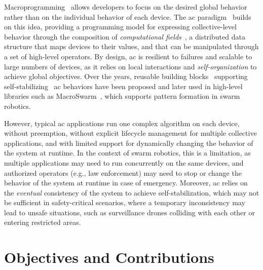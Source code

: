 \documentclass[conference]{IEEEtran}
\begin{document}
Macroprogramming~\cite{casadei22} allows developers to focus on the desired global behavior rather than on the individual behavior of each device.
%
The \ac{ac} paradigm~\cite{DBLP:journals/computer/BealPV15} builds on this idea,
providing a programming model for expressing collective-level behavior through the composition of \emph{computational fields}~\cite{JLAMP2019},
a distributed data structure that maps devices to their values,
and that can be manipulated through a set of high-level operators.
%
By design,
\ac{ac} is resilient to failures and scalable to large numbers of devices,
as it relies on local interactions and \emph{self-organization} to achieve global objectives.
%
Over the years, reusable building blocks~\cite{DBLP:journals/tomacs/ViroliABDP18}
supporting self-stabilizing~\cite{DBLP:journals/cacm/Dijkstra74} \ac{ac} behaviors
have been proposed and later used in high-level libraries such as MacroSwarm~\cite{DBLP:journals/lmcs/AguzziCV25},
which supports pattern formation in swarm robotics.

However,
typical \ac{ac} applications run one complex algorithm on each device,
without preemption,
without explicit lifecycle management for multiple collective applications,
and with limited support for dynamically changing the behavior of the system at runtime.
%
In the context of swarm robotics,
this is a limitation,
as multiple applications may need to run concurrently on the same devices,
and authorized operators (e.g., law enforcement) may need to stop or change the behavior of the system at runtime in case of emergency.
%
Moreover,
\ac{ac} relies on the \emph{eventual} consistency of the system to achieve self-stabilization,
which may not be sufficient in safety-critical scenarios,
where a temporary inconsistency may lead to unsafe situations,
such as surveillance drones colliding with each other or entering restricted areas.

\section{Objectives and Contributions}\label{sec:objectives-and-contributions}
\end{document}
